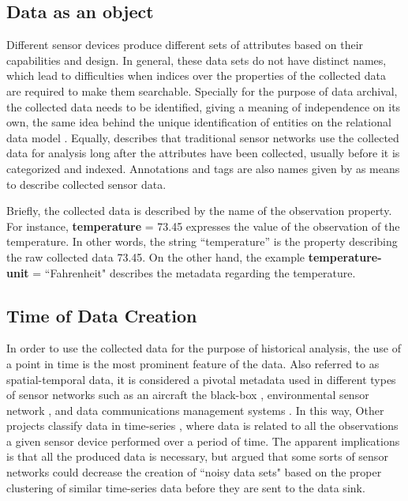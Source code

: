 \subsection{Data as an object}

Different sensor devices produce different sets of attributes based on their
capabilities and design. In general, these data sets do not have distinct
names, which lead to difficulties when indices over the properties of the
collected data are required to make them searchable. Specially for the purpose
of data archival, the collected data needs to be identified, giving a meaning
of independence on its own, the same idea behind the unique identification of
entities on the relational data model \cite{relational-model}. Equally,
\cite{sn-provenance} describes that traditional sensor networks use the
collected data for analysis long after the attributes have been collected,
usually before it is categorized and indexed. Annotations and tags are also
names given by \cite{sn-provenance} as means to describe collected sensor data.

Briefly, the collected data is described by the name of the observation
property. For instance, \textbf{temperature} = 73.45 expresses the value of the
observation of the temperature. In other words, the string ``temperature'' is
the property describing the raw collected data 73.45. On the other hand,
the example \textbf{temperature-unit} = ``Fahrenheit" describes the metadata
regarding the temperature.

\subsection{Time of Data Creation}

In order to use the collected data for the purpose of historical analysis, the
use of a point in time is the most prominent feature of the data. Also referred to
as spatial-temporal data, it is considered a pivotal metadata used in different
types of sensor networks such as an aircraft the black-box
\cite{sn-exemple-blackbox}, environmental sensor network \cite{sfbeams2006},
and data communications management systems \cite{sn-dataware-house}. In this
way, Other projects classify data in time-series \cite{sn-time-series-example},
where data is related to all the observations a given sensor device performed
over a period of time. The apparent implications is that all the produced data
is necessary, but \cite{sn-time-series} argued that some sorts of sensor
networks could decrease the creation of ``noisy data sets" based on the proper
clustering of similar time-series data before they are sent to the data
sink.

